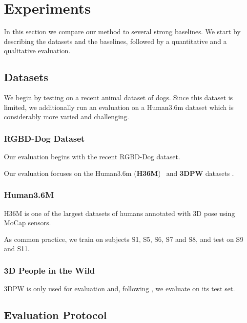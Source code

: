 \section{Experiments}\label{s:exp}

In this section we compare our method to several strong baselines.
We start by describing the datasets and the baselines, followed by a quantitative and a qualitative evaluation.





\subsection{Datasets}

We begin by testing on a recent animal dataset of dogs. Since this dataset is limited, we additionally run an evaluation on a Human3.6m dataset which is considerably more varied and challenging.

\subsubsection{RGBD-Dog Dataset}

Our evaluation begins with the recent RGBD-Dog dataset. 

Our evaluation focuses on the Human3.6m (\textbf{H36M})~\cite{ionescu2013human3,IonescuSminchisescu11} 
and \textbf{3DPW} datasets \cite{vonmarcard2018recovering}.

\subsubsection{Human3.6M}

H36M is one of the largest datasets of humans annotated with 3D pose using MoCap sensors.



As common practice, we train on subjects S1, S5, S6, S7 and S8, and test on S9 and S11. 

\subsubsection{3D People in the Wild}
3DPW is only used for evaluation and, following \cite{kolotouros19convolutional}, we evaluate on its test set.

\subsection{Evaluation Protocol}

